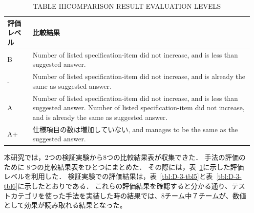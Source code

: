 \documentclass[a4paper,12pt]{jreport}
\begin{document}
\begin{table}[htbp]
  \centering
  \caption{TABLE IIICOMPARISON RESULT EVALUATION LEVELS}
    \begin{tabular}{|l|p{14.855em}|}
       \hline
    評価レベル & \multicolumn{1}{l|}{比較結果} \\
        \hline
     B    & Number of listed specification-item did not increase, and is less than suggested answer.  \\
        \hline
    -     & Number of listed specification-item did not increase, and is already the same as suggested answer.  \\
        \hline
    A     & Number of listed specification-item did not increase, and is less than suggested answer. Number of listed specification-item did not increase, and is already the same as suggested answer.  \\
       \hline
    A+    & 仕様項目の数は増加していない, and manages to be the same as the suggested answer.  \\
        \hline
    \end{tabular}%
  \label{tbl:D-3-tbl4}%
\end{table}%

  本研究では，2つの検証実験から8つの比較結果表が収集できた．
  手法の評価のために 8つの比較結果表をひとつにまとめた．
その際には，表~\ref{tbl:D-3-tbl4}に示した評価レベルを利用した． 検証実験での評価結果は，表~\ref{tbl:D-3-tbl5}と表~\ref{tbl:D-3-tbl6}に示したとおりである．
これらの評価結果を確認すると分かる通り、テストカテゴリを使った手法を実装した時の結果では、8チーム中７チームが、数値として効果が読み取れる結果となった。
\end{document}
